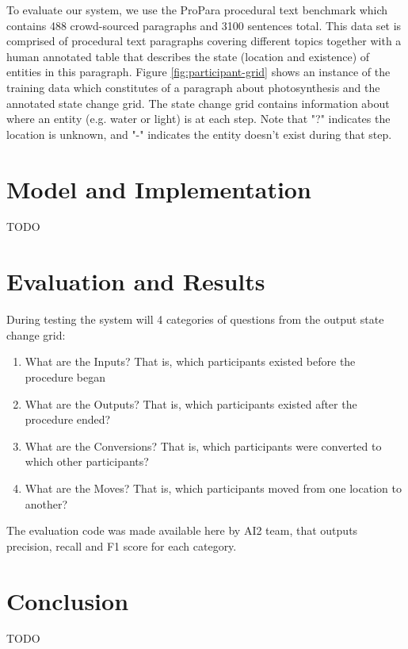 \documentclass[11pt,a4paper]{article}
\begin{document}
To evaluate our system, we use the ProPara procedural text benchmark 
which contains 488 crowd-sourced paragraphs and 3100 sentences total. 
This data set is comprised of procedural text paragraphs covering different 
topics together with a human annotated table that describes the state 
(location and existence) of entities in this paragraph. Figure 
\ref{fig:participant-grid} shows an instance of the training data which 
constitutes of a paragraph about photosynthesis and the annotated state 
change grid. The state change grid contains information about where an 
entity (e.g. water or light) is at each step. Note that "?" indicates the 
location is unknown, and "-" indicates the entity doesn't exist during that step.

\section{Model and Implementation}

TODO

\section{Evaluation and Results}

During testing the system will 4 categories of questions from the output 
state change grid: 

\begin{enumerate}
  \item What are the Inputs? That is, which participants existed before the 
  	  procedure began
  \item What are the Outputs? That is, which participants existed after 
	  the procedure ended?
  \item What are the Conversions? That is, which participants were 
  	  converted to which other participants?
  \item What are the Moves? That is, which participants 
	   moved from one location to another?
\end{enumerate}

The evaluation code was made available here by AI2 team, that outputs 
precision, recall and F1 score for each category.

\section{Conclusion}

TODO
\end{document}
